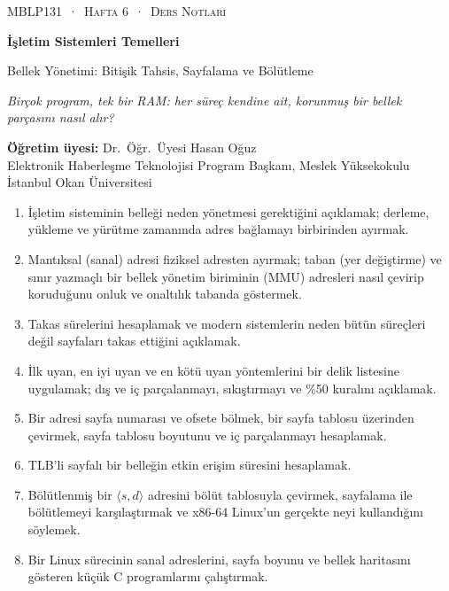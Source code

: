 \documentclass[11pt,a4paper]{article}
\begin{document}
\thispagestyle{empty}
\begin{tcolorbox}[enhanced,colback=dark,colframe=dark,arc=0pt,boxrule=0pt,
  left=18pt,right=18pt,top=20pt,bottom=20pt,coltext=white]
{\small\color{mint}\textsc{MBLP131 \,·\, Hafta 6 \,·\, Ders Notları}}\par\medskip
{\headfont\fontsize{26}{30}\selectfont\bfseries İşletim Sistemleri Temelleri}\par\medskip
{\large Bellek Yönetimi: Bitişik Tahsis, Sayfalama ve Bölütleme}\par\smallskip
{\small\itshape\color{white!70} Birçok program, tek bir RAM: her süreç kendine ait, korunmuş bir bellek parçasını nasıl alır?}
\end{tcolorbox}

\vspace{0.4em}
\begin{minipage}[t]{0.70\linewidth}
\small
\textbf{Öğretim üyesi:} Dr.\ Öğr.\ Üyesi Hasan Oğuz\\
Elektronik Haberleşme Teknolojisi Program Başkanı, Meslek Yüksekokulu\\
İstanbul Okan Üniversitesi
\end{minipage}

\vspace{0.8em}
\begin{keyidea}
\begin{enumerate}[leftmargin=1.4em]
  \item İşletim sisteminin belleği neden yönetmesi gerektiğini açıklamak; derleme, yükleme ve yürütme zamanında adres bağlamayı birbirinden ayırmak.
  \item Mantıksal (sanal) adresi fiziksel adresten ayırmak; taban (yer değiştirme) ve sınır yazmaçlı bir bellek yönetim biriminin (MMU) adresleri nasıl çevirip koruduğunu onluk ve onaltılık tabanda göstermek.
  \item Takas sürelerini hesaplamak ve modern sistemlerin neden bütün süreçleri değil sayfaları takas ettiğini açıklamak.
  \item İlk uyan, en iyi uyan ve en kötü uyan yöntemlerini bir delik listesine uygulamak; dış ve iç parçalanmayı, sıkıştırmayı ve \%50 kuralını açıklamak.
  \item Bir adresi sayfa numarası ve ofsete bölmek, bir sayfa tablosu üzerinden çevirmek, sayfa tablosu boyutunu ve iç parçalanmayı hesaplamak.
  \item TLB'li sayfalı bir belleğin etkin erişim süresini hesaplamak.
  \item Bölütlenmiş bir $\langle s, d\rangle$ adresini bölüt tablosuyla çevirmek, sayfalama ile bölütlemeyi karşılaştırmak ve x86-64 Linux'un gerçekte neyi kullandığını söylemek.
  \item Bir Linux sürecinin sanal adreslerini, sayfa boyunu ve bellek haritasını gösteren küçük C programlarını çalıştırmak.
\end{enumerate}
\end{keyidea}
\end{document}
